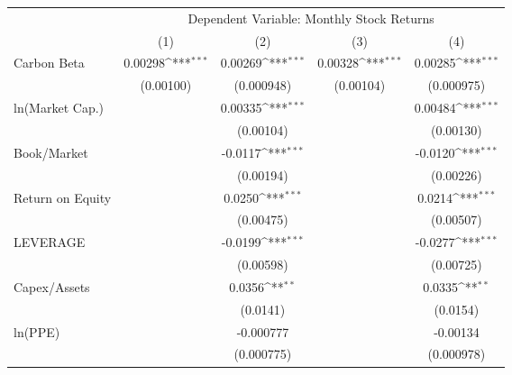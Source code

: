 {
\def\sym#1{\ifmmode^{#1}\else\(^{#1}\)\fi}
\begin{tabular}{l*{4}{c}}
\hline\hline
                    &\multicolumn{4}{c}{Dependent Variable: Monthly Stock Returns}                          \\\cmidrule(lr){2-5}
                    &\multicolumn{1}{c}{(1)}         &\multicolumn{1}{c}{(2)}         &\multicolumn{1}{c}{(3)}         &\multicolumn{1}{c}{(4)}         \\
\hline
Carbon Beta         &     0.00298\sym{***}&     0.00269\sym{***}&     0.00328\sym{***}&     0.00285\sym{***}\\
                    &   (0.00100)         &  (0.000948)         &   (0.00104)         &  (0.000975)         \\
ln(Market Cap.)     &                     &     0.00335\sym{***}&                     &     0.00484\sym{***}\\
                    &                     &   (0.00104)         &                     &   (0.00130)         \\
Book/Market         &                     &     -0.0117\sym{***}&                     &     -0.0120\sym{***}\\
                    &                     &   (0.00194)         &                     &   (0.00226)         \\
Return on Equity    &                     &      0.0250\sym{***}&                     &      0.0214\sym{***}\\
                    &                     &   (0.00475)         &                     &   (0.00507)         \\
LEVERAGE            &                     &     -0.0199\sym{***}&                     &     -0.0277\sym{***}\\
                    &                     &   (0.00598)         &                     &   (0.00725)         \\
Capex/Assets        &                     &      0.0356\sym{**} &                     &      0.0335\sym{**} \\
                    &                     &    (0.0141)         &                     &    (0.0154)         \\
ln(PPE)             &                     &   -0.000777         &                     &    -0.00134         \\
                    &                     &  (0.000775)         &                     &  (0.000978)         \\

\end{tabular}}
